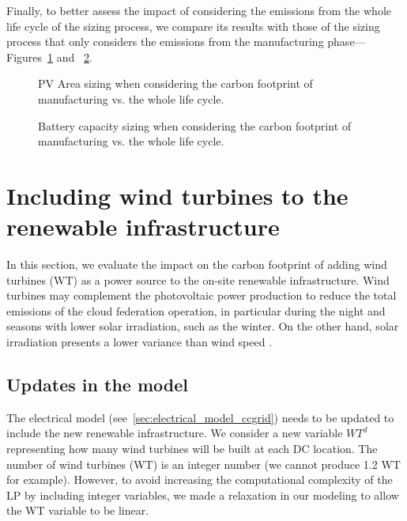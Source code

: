 Finally, to better assess the impact of considering the emissions from the whole life cycle of the sizing process, we compare its results with those of the sizing process that only considers the emissions from the manufacturing phase---Figures~\ref{fig:pv_lca} and ~\ref{fig:bat_lca}.


\begin{figure}[h]
  \centering
  {}
  \caption{PV Area sizing when considering the carbon footprint of manufacturing vs. the whole life cycle. }
  \label{fig:pv_lca}
\end{figure}


\begin{figure}[h]
  \centering
  {}
  \caption{Battery capacity sizing when considering the carbon footprint of manufacturing vs. the whole life cycle.  }
  \label{fig:bat_lca}
\end{figure}



\section{Including wind turbines to the renewable infrastructure}
\label{sec:add_wt}


In this section, we evaluate the impact on the carbon footprint of adding wind turbines (WT) as a power source to the on-site renewable infrastructure. Wind turbines may complement the photovoltaic power production to reduce the total emissions of the cloud federation operation, in particular during the night and seasons with lower solar irradiation, such as the winter. On the other hand, solar irradiation presents a lower variance than wind speed \cite{krakauer2017prediction_accuracy}.

\subsection{Updates in the model}
\label{sec:ex_model_wt}

The electrical model (see~\ref{sec:electrical_model_ccgrid}) needs to be updated to include the new renewable infrastructure. We consider a new variable $WT^d$ representing how many wind turbines will be built at each DC location. The number of wind turbines (WT) is an integer number (we cannot produce 1.2 WT for example). However, to avoid increasing the computational complexity of the LP by including integer variables, we made a relaxation in our modeling to allow the WT variable to be linear. 

